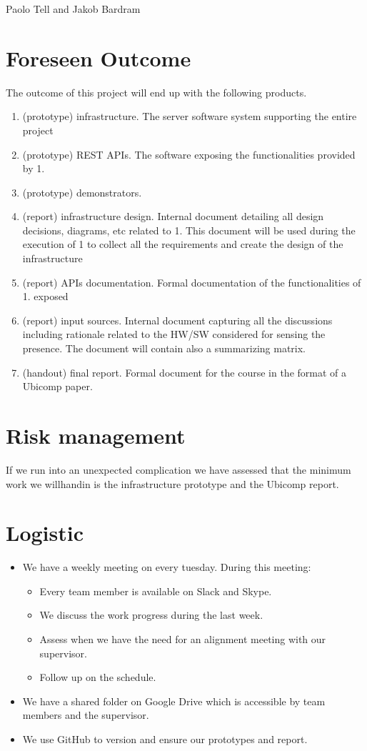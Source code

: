 \documentclass{sigchi}
\begin{document}
Paolo Tell and Jakob Bardram

\section{Foreseen Outcome}

The outcome of this project will end up with the following products.
\begin{enumerate}
\item (prototype) infrastructure. The server software system supporting the entire project
\item (prototype) REST APIs. The software exposing the functionalities provided by 1.
\item (prototype) demonstrators.
\item (report) infrastructure design. Internal document detailing all design decisions, diagrams, etc related to 1. This document will be used during the execution of 1 to collect all the requirements and create the design of the infrastructure
\item (report) APIs documentation. Formal documentation of the functionalities of 1. exposed
\item (report) input sources. Internal document capturing all the discussions including rationale related to the HW/SW considered for sensing the presence.  The document will contain also a summarizing matrix.
\item (handout) final report. Formal document for the course in the format of a Ubicomp paper.
\end{enumerate}

\section{Risk management}

If we run into an unexpected complication we have assessed that the minimum work we willhandin is the infrastructure prototype and the Ubicomp report.

\section{Logistic}

\begin{itemize}
\item We have a weekly meeting on every tuesday. During this meeting:
    \begin{itemize}
    \item Every team member is available on Slack and Skype.
    \item We discuss the work progress during the last week.
    \item Assess when we have the need for an alignment meeting with our supervisor.
    \item Follow up on the schedule.
    \end{itemize}
\item We have a shared folder on Google Drive which is accessible by team members and the supervisor.
\item We use GitHub to version and ensure our prototypes and report.
\end{itemize}
\end{document}
